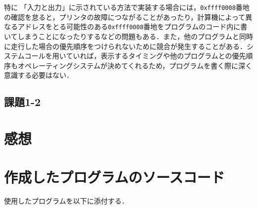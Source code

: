 特に 「入力と出力」に示されている方法で実装する場合には，\verb|0xffff0008|番地の確認を怠ると，プリンタの故障につながることがあったり，計算機によって異なるアドレスをとる可能性のある\verb|0xffff0008|番地をプログラムのコード内に書いてしまうことになったりするなどの問題もある．また，他のプログラムと同時に走行した場合の優先順序をつけられないために競合が発生することがある．システムコールを用いていれば，表示するタイミングや他のプログラムとの優先順序もオペレーティングシステムが決めてくれるため，プログラムを書く際に深く意識する必要はない．

\subsection{課題1-2}


\section{感想} \label{sec:review}


\section{作成したプログラムのソースコード} \label{sec:makep}

使用したプログラムを以下に添付する．



